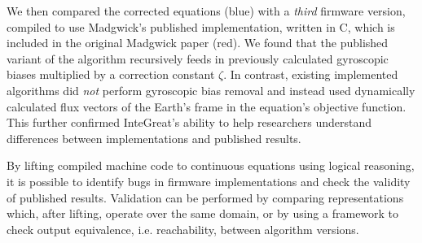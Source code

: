 We then compared the corrected equations (blue) with a \emph{third} firmware version, compiled to use Madgwick's published implementation, written in C, which is included in the original Madgwick paper (red).
We found that the published variant of the algorithm recursively feeds in previously calculated gyroscopic biases multiplied by a correction constant $\zeta$.
In contrast, existing implemented algorithms did \emph{not} perform gyroscopic bias removal and instead used dynamically calculated flux vectors of the Earth's frame in the equation's objective function.
This further confirmed InteGreat's ability to help researchers understand differences between implementations and published results.

By lifting compiled machine code to continuous equations using logical reasoning, it is possible to identify bugs in firmware implementations and check the validity of published results.
Validation can be performed by comparing representations which, after lifting, operate over the same domain, or by using a framework to check output equivalence, i.e. reachability, between algorithm versions.










